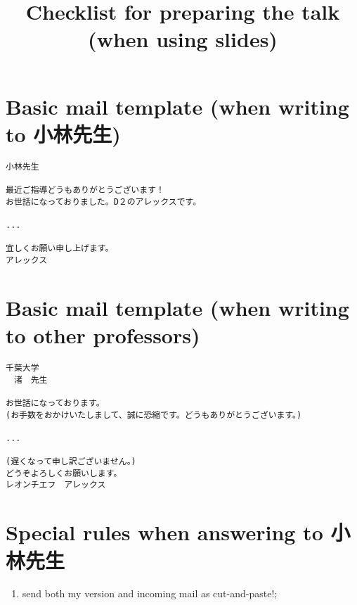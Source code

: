 \documentclass[12pt]{article} %
\title{Checklist for preparing the talk (when using slides)}
\begin{document}
\section{Basic mail template (when writing to 小林先生)}
\begin{verbatim}
小林先生

最近ご指導どうもありがとうございます！
お世話になっておりました。D２のアレックスです。

...

宜しくお願い申し上げます。
アレックス
\end{verbatim}
\section{Basic mail template (when writing to other professors)}
\begin{verbatim}
千葉大学
　渚　先生

お世話になっております。
(お手数をおかけいたしまして、誠に恐縮です。どうもありがとうございます。)

...

(遅くなって申し訳ございません。)
どうぞよろしくお願いします。
レオンチエフ　アレックス
\end{verbatim}
\section{Special rules when answering to 小林先生}
\begin{enumerate}
	\item send both my version and incoming mail as cut-and-paste!;
\end{enumerate}
\end{document}
